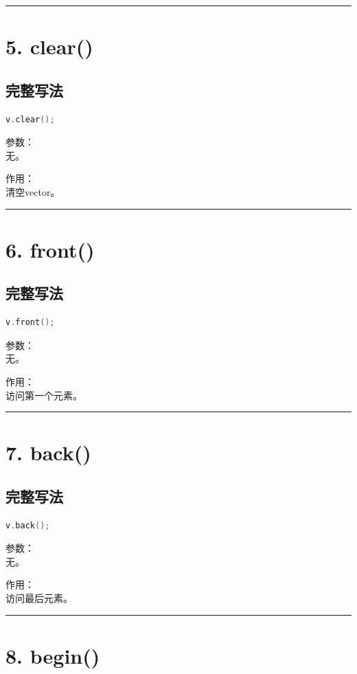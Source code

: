 \documentclass[9pt,twocolumn]{extarticle}
\begin{document}
\noindent\rule{\linewidth}{0.4pt}

\section{5. clear()}

\subsection{完整写法}
\begin{lstlisting}[language=C++]
v.clear();
\end{lstlisting}
参数：\\
无。

作用：\\
清空vector。

\noindent\rule{\linewidth}{0.4pt}

\section{6. front()}

\subsection{完整写法}
\begin{lstlisting}[language=C++]
v.front();
\end{lstlisting}
参数：\\
无。

作用：\\
访问第一个元素。

\noindent\rule{\linewidth}{0.4pt}

\section{7. back()}

\subsection{完整写法}
\begin{lstlisting}[language=C++]
v.back();
\end{lstlisting}
参数：\\
无。

作用：\\
访问最后元素。

\noindent\rule{\linewidth}{0.4pt}

\section{8. begin()}
\end{document}
